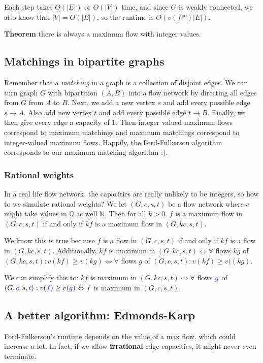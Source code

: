 \documentclass[11pt,a4paper,titlepage,dvipsnames,cmyk]{scrartcl}
\begin{document}
Each step takes $O(|E|)$ or $O(|V|)$ time, and since $G$ is weakly
connected, we also know that $|V| = O(|E|)$, so the runtime is
$O(v(f*)|E|)$.

\textbf{Theorem} there is always a maximum flow with integer values.

\subsection{Matchings in bipartite graphs}%
\label{sub:matching-bipartite}
Remember that a \textit{matching} in a graph is a collection of disjoint
edges. We can turn graph $G$ with bipartition $(A,B)$ into a flow network
by directing all edges from $G$ from $A$ to $B$. Next, we add a new vertex
$s$ and add every possible edge $s \rightarrow A$. Also add new vertex $t$
and add every possible edge $t \rightarrow B$. Finally, we then give every
edge a capacity of $1$. Then integer valued maximum flows correspond to
maximum matchings and maximum matchings correspond to integer-valued
maximum flows. Happily, the Ford-Fulkerson algorithm corresponds to our
maximum matching algorithm :).

\subsubsection{Rational weights}%
\label{ssub:rational-weights}

In a real life flow network, the capacities are really unlikely to be
integers, so how to we simulate rational weights? We let $(G,c,s,t)$ be a
flow network where $c$ might take values in $\mathbb{Q}$ as well
$\mathbb{N}$. Then for all $k > 0$, $f$ is a maximum flow in $(G,c,s,t)$
if and only if $kf$ is a maximum flow in $(G,kc,s,t)$.

We know this is true because $f$ is a flow in $(G,c,s,t)$ if and only if
$kf$ is a flow in $(G,kc,s,t)$. Additionally, $kf$ is maximum in
$(G,kc,s,t) \Leftrightarrow \forall$ flows $kg$ of $(G,kc,s,t): v(kf) \ge
v(kg) \Leftrightarrow \forall$ flows $g$ of $(G,c,s,t): v(kf) \ge v((kg)$.

We can simplify this to: $kf$ is maximum in $(G,kc,s,t) \Leftrightarrow
\forall$ flows ${\color{blue}g}$ of $(G, {\color{blue}c},s,t): v(
{\color{blue}f}) \ge v( {\color{blue}g}) \Leftrightarrow f$ is maximum in $(G,c,s,t)$.

\subsection{A better algorithm: Edmonds-Karp}%
\label{sub:edmonds-karp}
Ford-Fulkerson's runtime depends on the value of a max flow, which could
increase a lot. In fact, if we allow \textbf{irrational} edge capacities,
it might never even terminate.
\end{document}
